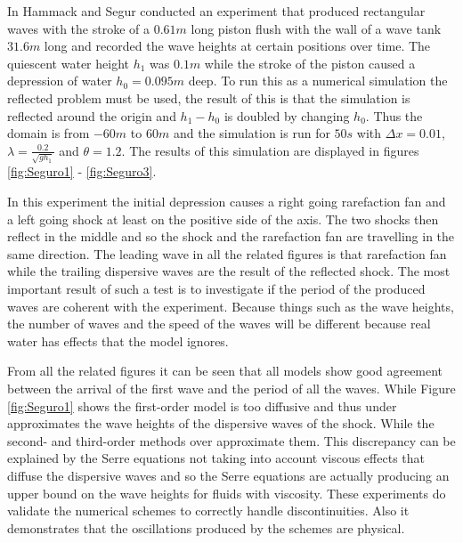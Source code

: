 \documentclass[SingleSpace,12pt]{Serre_ASCE}
\begin{document}
In \cite{Hammack-Segur-1978-337} Hammack and Segur conducted an experiment that produced rectangular waves with the stroke of a $0.61m$ long piston flush with the wall of a wave tank $31.6m$ long and recorded the wave heights at certain positions over time. The quiescent water height $h_1$ was $0.1m$ while the stroke of the piston caused a depression of water $h_0 = 0.095m$ deep. To run this as a numerical simulation the reflected problem must be used, the result of this is that the simulation is reflected around the origin and $h_1 - h_0$ is doubled by changing $h_0$. Thus the domain is from $-60m$ to $60m$ and the simulation is run for $50s$ with $\Delta x = 0.01$, $\lambda = \frac{0.2}{\sqrt{g h_1}}$ and $\theta = 1.2$. The results of this simulation are displayed in figures \ref{fig:Seguro1} - \ref{fig:Seguro3}.

In this experiment the initial depression causes a right going rarefaction fan and a left going shock at least on the positive side of the axis. The two shocks then reflect in the middle and so the shock and the rarefaction fan are travelling in the same direction. The leading wave in all the related figures is that rarefaction fan while the trailing dispersive waves are the result of the reflected shock. The most important result of such a test is to investigate if the period of the produced waves are coherent with the experiment. Because things such as the wave heights, the number of waves and the speed of the waves will be different because real water has effects that the model ignores.   

From all the related figures it can be seen that all models show good agreement between the arrival of the first wave and the period of all the waves. While Figure \ref{fig:Seguro1} shows the first-order model is too diffusive and thus under approximates the wave heights of the dispersive waves of the shock. While the second- and third-order methods over approximate them. This discrepancy can be explained by the Serre equations not taking into account viscous effects that diffuse the dispersive waves and so the Serre equations are actually producing an upper bound on the wave heights for fluids with viscosity. These experiments do validate the numerical schemes to correctly handle discontinuities. Also it demonstrates that the oscillations produced by the schemes are physical.  
\end{document}

